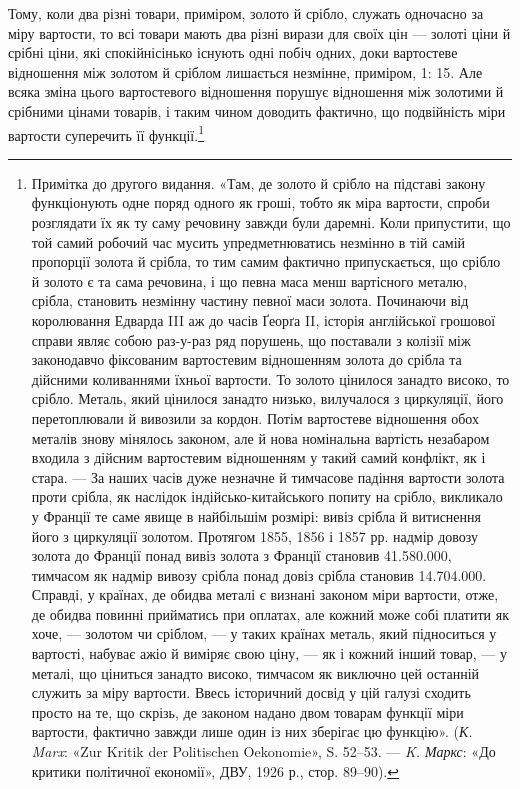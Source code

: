 Тому, коли два різні товари, приміром, золото й срібло,
служать одночасно за міру вартости, то всі товари мають два
різні вирази для своїх цін — золоті ціни й срібні ціни, які спокійнісінько
існують одні побіч одних, доки вартостеве відношення
між золотом й сріблом лишається незмінне, приміром,
1: 15. Але всяка зміна цього вартостевого відношення порушує
відношення між золотими й срібними цінами товарів, і таким
чином доводить фактично, що подвійність міри вартости суперечить
її функції.\footnote{
Примітка до другого видання. «Там, де золото й срібло на підставі
закону функціонують одне поряд одного як гроші, тобто як міра вартости,
спроби розглядати їх як ту саму речовину завжди були даремні. Коли припустити, що той самий робочий
час мусить упредметнюватись незмінно в тій самій пропорції золота й срібла, то тим самим фактично
припускається, що срібло й золото є та сама речовина, і що певна маса менш вартісного металю,
срібла, становить незмінну частину певної маси золота. Починаючи від королювання Едварда III аж до
часів Ґеорґа II, історія англійської грошової справи являє собою раз-у-раз ряд порушень, що
поставали з колізії між законодавчо фіксованим вартостевим відношенням
золота до срібла та дійсними коливаннями їхньої вартости. То золото цінилося занадто високо, то
срібло. Металь, який цінилося занадто низько, вилучалося з циркуляції, його перетоплювали й вивозили
за кордон. Потім вартостеве відношення обох металів знову мінялось законом, але й нова номінальна
вартість незабаром входила з дійсним вартостевим відношенням у такий самий конфлікт, як і стара. —
За наших часів дуже
незначне й тимчасове падіння вартости золота проти срібла, як наслідок індійсько-китайського попиту
на срібло, викликало у Франції те саме явище в найбільшім розмірі: вивіз срібла й витиснення його з
циркуляції золотом. Протягом 1855, 1856 і 1857 рр. надмір довозу золота до Франції понад вивіз
золота з Франції становив \num{41.580.000}, тимчасом як надмір вивозу срібла понад довіз
срібла становив \num{14.704.000}. Справді, у країнах, де обидва металі є визнані законом
міри вартости, отже, де обидва повинні прийматись при оплатах, але кожний може собі платити як хоче,
— золотом чи сріблом, — у таких країнах металь, який підноситься у вартості, набуває ажіо й виміряє
свою ціну, — як і кожний інший товар, — у металі, що ціниться занадто високо, тимчасом як виключно
цей останній служить за міру вартости. Ввесь історичний досвід у цій галузі сходить просто на те, що
скрізь, де законом надано двом товарам функції міри вартости, фактично завжди лише один із них
зберігає цю функцію». (\emph{К. Marx}: «Zur Kritik der Politischen Oekonomie», S. 52--53. — \emph{K. Маркс}: «До
критики політичної економії», ДВУ, 1926 р., стор. 89--90).
}

